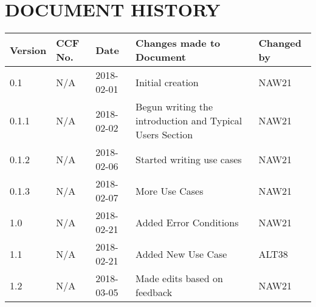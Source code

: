 \documentclass{project}
\begin{document}
\section*{DOCUMENT HISTORY}
\begin{tabular}{| l | l | l | l | l |}
\hline
Version & CCF No. & Date & Changes made to Document & Changed by \\
\hline
0.1 & N/A & 2018-02-01 & Initial creation & NAW21 \\
\hline
0.1.1 & N/A & 2018-02-02 & Begun writing the introduction and Typical Users Section & NAW21 \\
\hline
0.1.2 & N/A & 2018-02-06 & Started writing use cases & NAW21 \\
\hline
0.1.3 & N/A & 2018-02-07 & More Use Cases & NAW21 \\
\hline
1.0 & N/A & 2018-02-21 & Added Error Conditions & NAW21 \\
\hline
1.1 & N/A & 2018-02-21 & Added New Use Case & ALT38 \\
\hline
1.2 & N/A & 2018-03-05 & Made edits based on feedback & NAW21 \\
\hline
\end{tabular}
\label{thelastpage}
\end{document}
